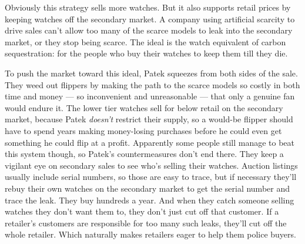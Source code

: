 Obviously this strategy sells more watches. But it also supports retail
prices by keeping watches off the secondary market. A company using
artificial scarcity to drive sales can't allow too many of the scarce
models to leak into the secondary market, or they stop being scarce. The
ideal is the watch equivalent of carbon sequestration: for the people
who buy their watches to keep them till they die.

To push the market toward this ideal, Patek squeezes from both sides of
the sale. They weed out flippers by making the path to the scarce models
so costly in both time and money --- so inconvenient and unreasonable
--- that only a genuine fan would endure it. The lower tier watches sell
for below retail on the secondary market, because Patek \emph{doesn't}
restrict their supply, so a would-be flipper should have to spend years
making money-losing purchases before he could even get something he
could flip at a profit. Apparently some people still manage to beat this
system though, so Patek's countermeasures don't end there. They keep a
vigilant eye on secondary sales to see who's selling their watches.
Auction listings usually include serial numbers, so those are easy to
trace, but if necessary they'll rebuy their own watches on the secondary
market to get the serial number and trace the leak. They buy hundreds a
year. And when they catch someone selling watches they don't want them
to, they don't just cut off that customer. If a retailer's customers are
responsible for too many such leaks, they'll cut off the whole retailer.
Which naturally makes retailers eager to help them police buyers.

